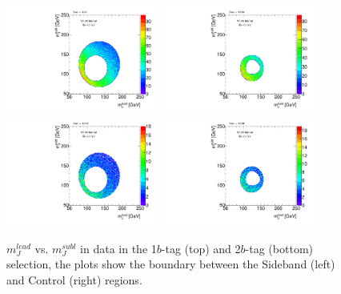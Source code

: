 \begin{figure}[htbp!]
\begin{center}
  \includegraphics[angle=270, width=0.45\textwidth]{./figures/boosted/Other/Sideband_OneTag_mH0H1.pdf}
  \includegraphics[angle=270, width=0.45\textwidth]{./figures/boosted/Other/Control_OneTag_mH0H1.pdf}\\
  \includegraphics[angle=270, width=0.45\textwidth]{./figures/boosted/Other/Sideband_TwoTag_mH0H1.pdf}
  \includegraphics[angle=270, width=0.45\textwidth]{./figures/boosted/Other/Control_TwoTag_mH0H1.pdf}
  \caption{$m_J^{lead}$ vs. $m_J^{subl}$ in data in the 1$b$-tag (top) and 2$b$-tag (bottom) selection, the plots show the boundary between the Sideband (left) and Control (right) regions.}
  \label{fig:boosted-region-def}
\end{center}
\end{figure}

